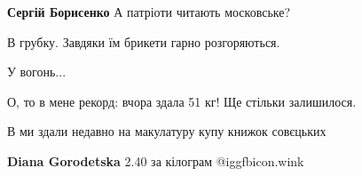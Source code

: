\begin{itemize}
\begin{itemize}
 
\textbf{Сергій Борисенко} А патріоти читають московське?
\end{itemize}

 
В грубку. Завдяки їм брикети гарно розгоряються.

 
У вогонь...

 
О, то в мене рекорд: вчора здала 51 кг! Ще стільки залишилося.

 
В ми здали недавно на макулатуру купу книжок совєцьких

\begin{itemize}
 
\textbf{Diana Gorodetska} 2.40 за кілограм  @igg{fbicon.wink} 
\end{itemize}

 

\end{itemize}
